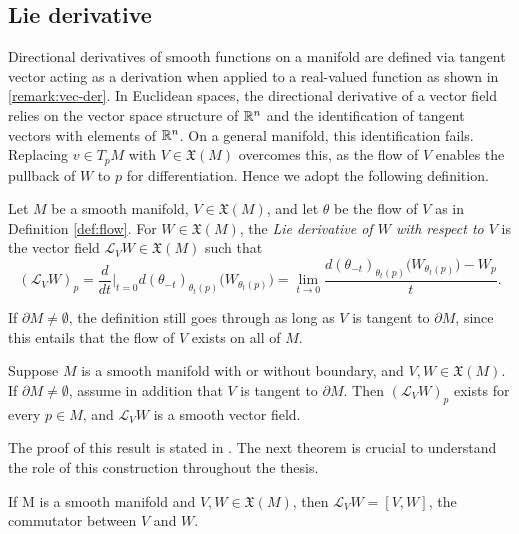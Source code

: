 \subsection*{Lie derivative} 
Directional derivatives of smooth functions on a manifold are defined via tangent vector acting as a derivation when applied to a real-valued function as shown in \ref{remark:vec-der}. In Euclidean spaces, the directional derivative of a vector field relies on the vector space structure of $\mathbb{R}^n$ and the identification of tangent vectors with elements of $\mathbb{R}^n$. On a general manifold, this identification fails. Replacing $v \in T_pM$ with $V \in \mathfrak{X}(M)$ overcomes this, as the flow of $V$ enables the pullback of $W$ to $p$ for differentiation. 
Hence we adopt the following definition.

\begin{definition}\label{def:lie-der}
	Let $M$ be a smooth manifold, $V \in \mathfrak{X}(M)$, and let $\theta$ be the flow of $V$ as in Definition \ref{def:flow}. For $W \in \mathfrak{X}(M)$, the \emph{Lie derivative of $W$ with respect to $V$} is the vector field $\mathscr{L}_VW \in \mathfrak{X}(M)$ such that
	\begin{equation}
		(\mathscr{L}_VW)_p = \frac{d}{dt}\Big|_{t=0} d(\theta_{-t})_{\theta_t(p)}\big(W_{\theta_t(p)}\big) = \lim_{t\to 0} \frac{d(\theta_{-t})_{\theta_t(p)}\big(W_{\theta_t(p)}\big) - W_p}{t}. \label{eq:lie-der}
	\end{equation}
\end{definition}

If $\partial M \neq \emptyset$, the definition still goes through as long as $V$ is tangent to $\partial M$, since this entails that the flow of $V$ exists on all of $M$.

\begin{lemma}
	Suppose $M$ is a smooth manifold with or without boundary, and $V, W \in \mathfrak{X}(M)$. If $\partial M \neq \emptyset$, assume in addition that $V$ is tangent to $\partial M$. Then $(\mathscr{L}_VW)_p$ exists for every $p \in M$, and $\mathscr{L}_VW$ is a smooth vector field.
\end{lemma}

\noindent The proof of this result is stated in \cite[Lemma 9.36]{leeIntroductionSmoothManifolds2013}. The next theorem is crucial to understand the role of this construction throughout the thesis.

\begin{theorem}\label{thm:lie-der-comm}
	If M is a smooth manifold and $V, W \in \mathfrak{X}(M)$, then $\mathscr{L}_VW = [V,W]$, the commutator between $V$ and $W$.
\end{theorem}

